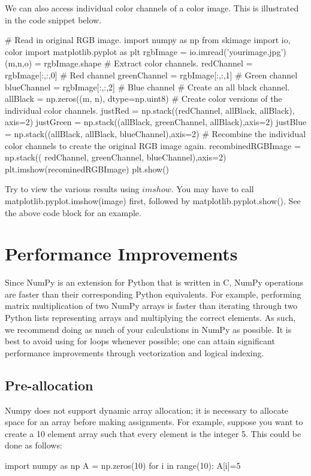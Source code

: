 \documentclass{article}
\begin{document}
We can also access individual color channels of a color image. This is illustrated in the code snippet below.
\begin{python}
# Read in original RGB image.
import numpy as np
from skimage import io, color
import matplotlib.pyplot as plt
rgbImage = io.imread('yourimage.jpg')
(m,n,o) = rgbImage.shape
# Extract color channels.
redChannel = rgbImage[:,:,0] # Red channel
greenChannel = rgbImage[:,:,1] # Green channel
blueChannel = rgbImage[:,:,2] # Blue channel
# Create an all black channel.
allBlack = np.zeros((m, n), dtype=np.uint8)
# Create color versions of the individual color channels.
justRed = np.stack((redChannel, allBlack, allBlack), axis=2)
justGreen = np.stack((allBlack, greenChannel, allBlack),axis=2)
justBlue = np.stack((allBlack, allBlack, blueChannel),axis=2)
# Recombine the individual color channels to create the original RGB image again.
recombinedRGBImage = np.stack(( redChannel, greenChannel, blueChannel),axis=2)
plt.imshow(recominedRGBImage)
plt.show()
\end{python}

Try to view the various results using \href{https://matplotlib.org/api/_as_gen/matplotlib.pyplot.imshow.html}{$imshow$}. You may have to call matplotlib.pyplot.imshow(image) first, followed by matplotlib.pyplot.show(). See the above code block for an example.


\section{Performance Improvements}
Since NumPy is an extension for Python that is written in C, NumPy operations are faster than their corresponding Python equivalents. For example, performing matrix multiplication of two NumPy arrays is faster than iterating through two Python lists representing arrays and multiplying the correct elements. As such, we recommend doing as much of your calculations in NumPy as possible.
It is best to avoid using for loops whenever possible; one can attain significant performance improvements through vectorization and logical indexing.

\subsection{Pre-allocation}
Numpy does not support dynamic array allocation; it is necessary to allocate space for an array before making assignments. For example, suppose you want to create a 10 element array such that every element is the integer 5. This could be done as follows:
\begin{python}
import numpy as np
A = np.zeros(10)
for i in range(10):
    A[i]=5
\end{python}
\end{document}
